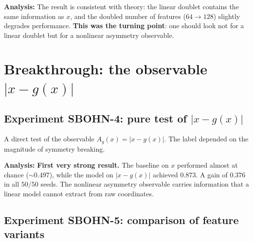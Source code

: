 \documentclass[11pt,a4paper]{report}
\begin{document}
\noindent{}


\noindent{}


\textbf{Analysis:} The result is consistent with theory: the linear doublet contains the same information
as $x$, and the doubled number of features ($64\to128$) slightly degrades performance. \textbf{This was
the turning point}: one should look not for a linear doublet but for a nonlinear asymmetry observable.


\section{Breakthrough: the observable $|x-g(x)|$}

\subsection{Experiment SBOHN-4: pure test of $|x-g(x)|$}

A direct test of the observable $A_g(x)=|x-g(x)|$. The label depended on the magnitude
of symmetry breaking.

\noindent{}


\noindent{}


\textbf{Analysis:} \textbf{First very strong result.} The baseline on $x$ performed
almost at chance (${\sim}0.497$), while the model on $|x-g(x)|$ achieved $0.873$.
A gain of $0.376$ in all $50/50$ seeds. The nonlinear asymmetry observable
carries information that a linear model cannot extract from raw
coordinates.

\subsection{Experiment SBOHN-5: comparison of feature variants}
\end{document}

